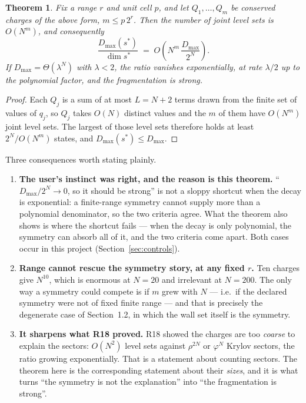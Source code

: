 \documentclass[11pt]{article}
\theoremstyle{plain}
\newtheorem{theorem}{Theorem}
\begin{document}
\begin{theorem}
Fix a range $r$ and unit cell $p$, and let $Q_1,\ldots,Q_m$ be conserved charges
of the above form, $m \le p\,2^r$. Then the number of joint level sets is
$O(N^m)$, and consequently
\[
\frac{D_{\max}(s^*)}{\dim s^*} \;=\; O\!\left(N^{m}\,\frac{D_{\max}}{2^N}\right).
\]
If $D_{\max} = \Theta(\lambda^N)$ with $\lambda<2$, the ratio vanishes
exponentially, at rate $\lambda/2$ up to the polynomial factor, and the
fragmentation is strong.
\end{theorem}

\begin{proof}
Each $Q_j$ is a sum of at most $L = N+2$ terms drawn from the finite set of
values of $q_j$, so $Q_j$ takes $O(N)$ distinct values and the $m$ of them have
$O(N^m)$ joint level sets. The largest of those level sets therefore holds at
least $2^N/O(N^m)$ states, and $D_{\max}(s^*) \le D_{\max}$.
\end{proof}

\noindent Three consequences worth stating plainly.

\begin{enumerate}
\item \textbf{The user's instinct was right, and the reason is this theorem.}
``$D_{\max}/2^N \to 0$, so it should be strong'' is not a sloppy shortcut when
the decay is exponential: a finite-range symmetry cannot supply more than a
polynomial denominator, so the two criteria agree. What the theorem also shows
is where the shortcut fails --- when the decay is only polynomial, the symmetry
can absorb all of it, and the two criteria come apart. Both cases occur in this
project (Section~\ref{sec:controls}).

\item \textbf{Range cannot rescue the symmetry story, at any fixed $r$.} Ten
charges give $N^{10}$, which is enormous at $N=20$ and irrelevant at $N=200$.
The only way a symmetry could compete is if $m$ grew with $N$ --- i.e.\ if the
declared symmetry were not of fixed finite range --- and that is precisely the
degenerate case of Section~1.2, in which the wall set itself is the symmetry.

\item \textbf{It sharpens what R18 proved.} R18 showed the charges are too
\emph{coarse} to explain the sectors: $O(N^2)$ level sets against $\rho^{2N}$ or
$\varphi^N$ Krylov sectors, the ratio growing exponentially. That is a statement
about counting sectors. The theorem here is the corresponding statement about
their \emph{sizes}, and it is what turns ``the symmetry is not the explanation''
into ``the fragmentation is strong''.
\end{enumerate}
\end{document}
